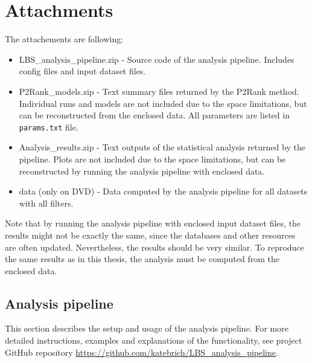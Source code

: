\documentclass[12pt,a4paper]{report}
\begin{document}
\appendix
\chapter{Attachments}

\singlespacing

The attachements are following:
\begin{itemize}
\item LBS\_analysis\_pipeline.zip - Source code of the analysis pipeline. Includes config files and input dataset files.
\item P2Rank\_models.zip - Text summary files returned by the P2Rank method. Individual runs and models are not included due to the space limitations, but can be reconstructed from the enclosed data. All parameters are listed in \texttt{params.txt} file.
\item Analysis\_results.zip - Text outputs of the statistical analysis returned by the pipeline. Plots are not included due to the space limitations, but can be reconstructed by running the analysis pipeline with enclosed data.
\item data (only on DVD) - Data computed by the analysis pipeline for all datasets with all filters.
\end{itemize}

Note that by running the analysis pipeline with enclosed input dataset files, the results might not be exactly the same, since the databases and other resources are often updated. Nevertheless, the results should be very similar. To reproduce the same results as in this thesis, the analysis must be computed from the enclosed data.


\section{Analysis pipeline} \label{a:pipeline}
This section describes the setup and usage of the analysis pipeline. For more detailed instructions, examples and explanations of the functionality, see project GitHub repository \url{https://github.com/katebrich/LBS_analysis_pipeline}.
\end{document}
